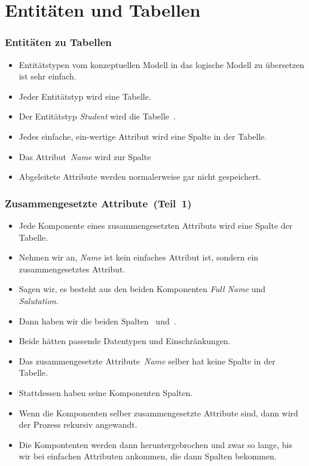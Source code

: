 \documentclass[aspectratio=169,mathserif,notheorems]{beamer}%
\begin{document}
\section{Entitäten und Tabellen}%
%
\begin{frame}%
\frametitle{Entitäten zu Tabellen}%
\begin{itemize}%
\item Entitätstypen vom konzeptuellen Modell in das logische Modell zu übersetzen ist sehr einfach.%
%
\item<2-> Jeder Entitätstyp wird eine Tabelle.%
%
\item<3-> Der Entitätstyp \emph{Student} wird die Tabelle~.%
%
\item<4-> Jedes einfache, ein-wertige Attribut wird eine Spalte in der Tabelle.%
%
\item<5-> Das Attribut~\emph{Name} wird zur Spalte~%
%
\item<8-> Abgeleitete Attribute werden normalerweise gar nicht gespeichert.
\end{itemize}%
\end{frame}%
%
\begin{frame}%
\frametitle{Zusammengesetzte Attribute~(Teil~1)}%
\begin{itemize}%
\item Jede Komponente eines zusammengesetzten Attributs wird eine Spalte der Tabelle.%
\item<2-> Nehmen wir an, \emph{Name} ist kein einfaches Attribut ist, sondern ein zusammengesetztes Attribut.%
\item<3-> Sagen wir, es besteht aus den beiden Komponenten \emph{Full Name} und \emph{Salutation}.%
\item<4-> Dann haben wir die beiden Spalten~ und~.%
\item<5-> Beide hätten passende Datentypen und Einschränkungen.%
\item<6-> Das zusammengesetzte Attribute~\emph{Name} selber hat keine Spalte in der Tabelle.%
\item<7-> Stattdessen haben seine Komponenten Spalten.%
\item<8-> Wenn die Komponenten selber zusammengesetzte Attribute sind, dann wird der Prozess rekursiv angewandt.%
\item<9-> Die Kompontenten werden dann heruntergebrochen und zwar so lange, bis wir bei einfachen Attributen ankommen, die dann Spalten bekommen.%
\end{itemize}%
\end{frame}%
\end{document}
